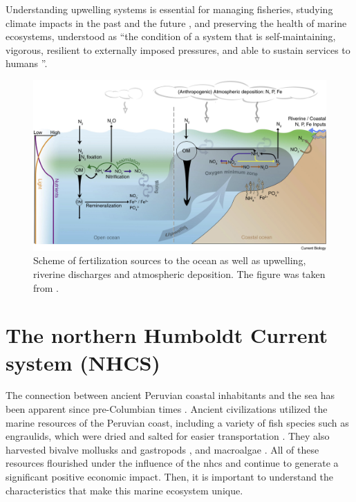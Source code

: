 Understanding upwelling systems is essential for managing fisheries, studying climate impacts in the past and the future \citep{BakuBlac2015,DiLo2015,TimZori2016}, and preserving the health of marine ecosystems, understood as ``the condition of a system that is self-maintaining, vigorous, resilient to externally imposed pressures, and able to sustain services to humans \citep{TettGowe2013}''.\\

\begin{figure}[H]
	\includegraphics[width=1.0\textwidth]{figures/Chap1UpwellingFertilization.jpg}
	\centering
	\caption{Scheme of fertilization sources to the ocean as well as upwelling, riverine discharges and atmospheric deposition. The figure was taken from \cite{BrisMohr2017}.}
	\centering
	\label{Chap1UpwellingFertilization}
\end{figure}

\clearpage
\section{The northern Humboldt Current system (NHCS)}\label{Chap1NHCS}

The connection between ancient Peruvian coastal inhabitants and the sea has been apparent since pre-Columbian times \citep{Prie2014,Prie2019}. Ancient civilizations utilized the marine resources of the Peruvian coast, including a variety of fish species such as engraulids, which were dried and salted for easier transportation \citep{MarcSomm1999}. They also harvested bivalve mollusks and gastropods \citep{ChicRoja2013,WeinOsbo2022}, and macroalgae \citep{AvilPadi2020}. All of these resources flourished under the influence of the \acrfull{nhcs} and continue to generate a significant positive economic impact. Then, it is important to understand the characteristics that make this marine ecosystem unique.\\

